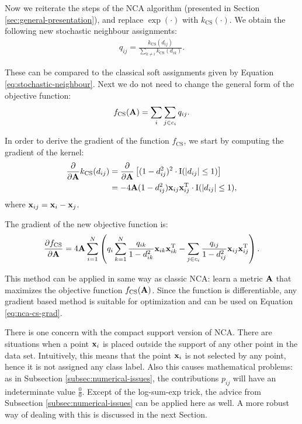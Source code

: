 	Now we reiterate the steps of the NCA algorithm (presented in Section \ref{sec:general-presentation}), and replace $\exp(\cdot)$ with $k_\text{CS}(\cdot)$. We obtain the following new stochastic neighbour assignments:
	\begin{align}
		q_{ij} = \frac{k_{\text{CS}}(d_{ij})}{\sum_{k\neq i} k_{\text{CS}}(d_{ik})}.
		\label{eq:stochastic-neighbours-cs}
	\end{align}
	
	These can be compared to the classical soft assignments given by Equation \ref{eq:stochastic-neighbour}. Next we do not need to change the general form of the objective function: 
	\begin{align}
		f_\text{CS}(\mathbf{A}) = \sum_{i}\sum_{j\in c_i} q_{ij}.
	\end{align}
	
	In order to derive the gradient of the function $f_\text{CS}$, we start by computing the gradient of the kernel:
	\begin{align}
		\frac{\partial}{\partial\mathbf{A}}k_\text{CS}(d_{ij}) 
		&= 
	\frac{\partial}{\partial\mathbf{A}}\left[(1-d_{ij}^2)^2\cdot\mathrm{I}(\left|d_{ij}\right|\le
	1)\right]\notag\\
		&= -4\mathbf{A}(1-d_{ij}^2)  \mathbf{x}_{ij} \mathbf{x}_{ij}^\mathrm{T} \cdot
	\mathrm{I}(\left|d_{ij}\right|\le 1),\label{eq:nca-cs-grad-kernel}
	\end{align}
	where $\mathbf{x}_{ij}=\mathbf{x}_i-\mathbf{x}_j$.
	
	The gradient of the new objective function is:
	\begin{align}
		\frac{\partial f_\text{CS}}{\partial \mathbf{A}}=4\mathbf{A}\sum_{i=1}^{N}
		\left(
		q_i \sum_{k=1}^N \frac{q_{ik}}{1-d_{ik}^2} \mathbf{x}_{ik}\mathbf{x}_{ik}^{\textrm{T}}
		- \sum_{j\in c_i} \frac{q_{ij}}{1-d_{ij}^2}\mathbf{x}_{ij}\mathbf{x}_{ij}^{\textrm{T}} 
		\right).
		\label{eq:nca-cs-grad}
	\end{align}
	
	This method can be applied in same way as classic NCA: learn a metric $\mathbf{A}$ that maximizes the objective function $f_\text{CS}(\mathbf{A})$. Since the function is differentiable, any gradient based method is suitable for optimization and can be used on Equation \ref{eq:nca-cs-grad}.
	
	There is one concern with the compact support version of NCA. There are situations when a point $\mathbf{x}_i$ is placed outside the support of any other point in the data set. Intuitively, this means that the point $\mathbf{x}_i$ is not selected by any point, hence it is not assigned any class label. Also this causes mathematical problems: as in Subsection \ref{subsec:numerical-issues}, the contributions $p_{ij}$ will have an indeterminate value $\frac{0}{0}$. Except of the log-sum-exp trick, the advice from Subsection \ref{subsec:numerical-issues} can be applied here as well. A more robust way of dealing with this is discussed in the next Section.
	
